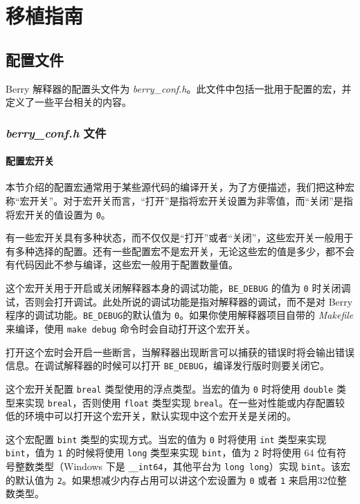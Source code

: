 \chapter{移植指南}

\section{配置文件}

Berry 解释器的配置头文件为 \textsl{berry\_conf.h}。此文件中包括一批用于配置的宏，并定义了一些平台相关的内容。

\subsection{\textsl{berry\_conf.h} 文件}

\subsubsection{配置宏开关}

本节介绍的配置宏通常用于某些源代码的编译开关，为了方便描述，我们把这种宏称“宏开关”。对于宏开关而言，“打开”是指将宏开关设置为非零值，而“关闭”是指将宏开关的值设置为 \texttt{0}。

有一些宏开关具有多种状态，而不仅仅是“打开”或者“关闭”，这些宏开关一般用于有多种选择的配置。还有一些配置宏不是宏开关，无论这些宏的值是多少，都不会有代码因此不参与编译，这些宏一般用于配置数量值。

 \label{section::BE_DEBUG}

这个宏开关用于开启或关闭解释器本身的调试功能，\texttt{BE\_DEBUG} 的值为 \texttt{0} 时关闭调试，否则会打开调试。此处所说的调试功能是指对解释器的调试，而不是对 Berry 程序的调试功能。\texttt{BE\_DEBUG}的默认值为 \texttt{0}。如果你使用解释器项目自带的 \textsl{Makefile} 来编译，使用 \texttt{make debug} 命令时会自动打开这个宏开关。

打开这个宏时会开启一些断言，当解释器出现断言可以捕获的错误时将会输出错误信息。在调试解释器的时候可以打开 \texttt{BE\_DEBUG}，编译发行版时则要关闭它。


这个宏开关配置 \texttt{breal} 类型使用的浮点类型。当宏的值为 \texttt{0} 时将使用 \texttt{double} 类型来实现 \texttt{breal}，否则使用 \texttt{float} 类型实现 \texttt{breal}。在一些对性能或内存配置较低的环境中可以打开这个宏开关，默认实现中这个宏开关是关闭的。


这个宏配置 \texttt{bint} 类型的实现方式。当宏的值为 \texttt{0} 时将使用 \texttt{int} 类型来实现 \texttt{bint}，值为 \texttt{1} 的时候将使用 \texttt{long} 类型来实现 \texttt{bint}，值为 \texttt{2} 时将使用 $64$ 位有符号整数类型（Windows 下是 \texttt{\_\_int64}，其他平台为 \texttt{long long}）实现 \texttt{bint}。该宏的默认值为 \texttt{2}。如果想减少内存占用可以讲这个宏设置为 \texttt{0} 或者 \texttt{1} 来启用$32$位整数类型。

